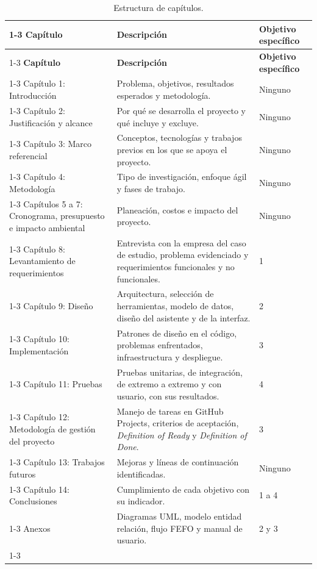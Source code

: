 \begin{longtable}{|p{4.3cm}|p{8.7cm}|p{2.3cm}|}
\caption{Estructura de capítulos.}\label{tab:estructura_capitulos}\\
\cline{1-3}
\cellcolor[gray]{0.9}\textbf{Capítulo} & \cellcolor[gray]{0.9}\textbf{Descripción} & \cellcolor[gray]{0.9}\textbf{Objetivo específico}\\
\cline{1-3}
\endfirsthead
\cline{1-3}
\cellcolor[gray]{0.9}\textbf{Capítulo} & \cellcolor[gray]{0.9}\textbf{Descripción} & \cellcolor[gray]{0.9}\textbf{Objetivo específico}\\
\cline{1-3}
\endhead
Capítulo 1: Introducción & Problema, objetivos, resultados esperados y metodología. & Ninguno\\ \cline{1-3}
Capítulo 2: Justificación y alcance & Por qué se desarrolla el proyecto y qué incluye y excluye. & Ninguno\\ \cline{1-3}
Capítulo 3: Marco referencial & Conceptos, tecnologías y trabajos previos en los que se apoya el proyecto. & Ninguno\\ \cline{1-3}
Capítulo 4: Metodología & Tipo de investigación, enfoque ágil y fases de trabajo. & Ninguno\\ \cline{1-3}
Capítulos 5 a 7: Cronograma, presupuesto e impacto ambiental & Planeación, costos e impacto del proyecto. & Ninguno\\ \cline{1-3}
Capítulo 8: Levantamiento de requerimientos & Entrevista con la empresa del caso de estudio, problema evidenciado y requerimientos funcionales y no funcionales. & 1\\ \cline{1-3}
Capítulo 9: Diseño & Arquitectura, selección de herramientas, modelo de datos, diseño del asistente y de la interfaz. & 2\\ \cline{1-3}
Capítulo 10: Implementación & Patrones de diseño en el código, problemas enfrentados, infraestructura y despliegue. & 3\\ \cline{1-3}
Capítulo 11: Pruebas & Pruebas unitarias, de integración, de extremo a extremo y con usuario, con sus resultados. & 4\\ \cline{1-3}
Capítulo 12: Metodología de gestión del proyecto & Manejo de tareas en GitHub Projects, criterios de aceptación, \textit{Definition of Ready} y \textit{Definition of Done}. & 3\\ \cline{1-3}
Capítulo 13: Trabajos futuros & Mejoras y líneas de continuación identificadas. & Ninguno\\ \cline{1-3}
Capítulo 14: Conclusiones & Cumplimiento de cada objetivo con su indicador. & 1 a 4\\ \cline{1-3}
Anexos & Diagramas UML, modelo entidad relación, flujo FEFO y manual de usuario. & 2 y 3\\ \cline{1-3}
\end{longtable}

